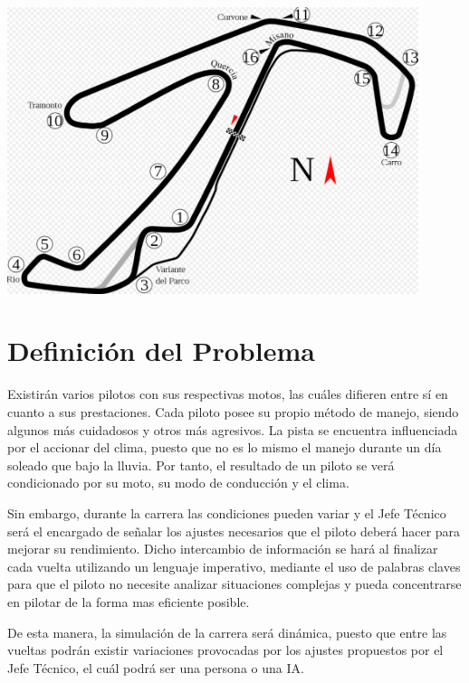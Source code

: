 \documentclass[12pt, letterpaper,spanish]{article}
\theoremstyle{definition}
\theoremstyle{remark}
\begin{document}
	\begin{center}
		\includegraphics[width = 12cm]{circuito} 
	\end{center}
	
\section{Definición del Problema}
	Existirán varios pilotos con sus respectivas motos, las cuáles difieren entre sí en cuanto a sus prestaciones. Cada piloto posee su propio método de manejo, siendo algunos más cuidadosos y otros más agresivos. La pista se encuentra influenciada por el accionar del clima, puesto que no es lo mismo el manejo durante un día soleado que bajo la lluvia. Por tanto, el resultado de un piloto se verá condicionado por su moto, su modo de conducción y el clima.\par
	Sin embargo, durante la carrera las condiciones pueden variar y el Jefe Técnico será el encargado de señalar los ajustes necesarios que el piloto deberá hacer para mejorar su rendimiento. Dicho intercambio de información se hará al finalizar cada vuelta utilizando un lenguaje imperativo, mediante el uso de palabras claves para que el piloto no necesite analizar situaciones complejas y pueda concentrarse en pilotar de la forma mas eficiente posible.\par
	De esta manera, la simulación de la carrera será dinámica, puesto que entre las vueltas podrán existir variaciones provocadas por los ajustes propuestos por el Jefe Técnico, el cuál podrá ser una persona o una IA.\par
	
\end{document}
